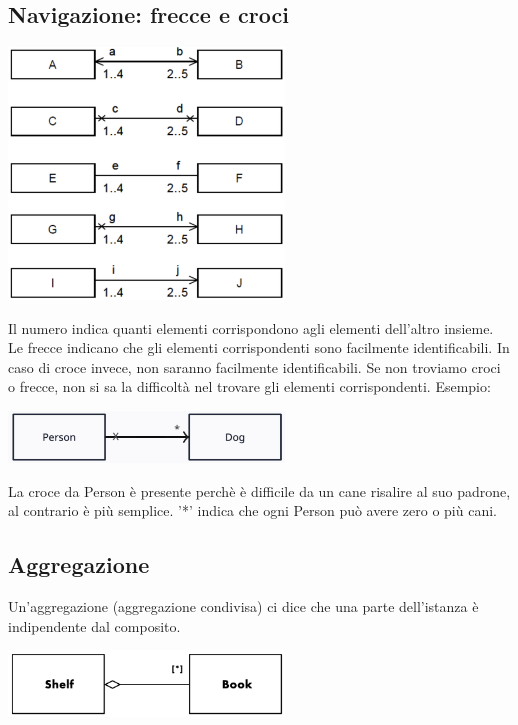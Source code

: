 \documentclass{article}
\begin{document}
\subsection*{Navigazione: frecce e croci}
\large
\begin{center}
    \includegraphics[width=0.55\textwidth]{foto 8.png}
\end{center}
Il numero indica quanti elementi corrispondono agli elementi dell'altro insieme. Le frecce indicano che gli elementi corrispondenti sono facilmente identificabili. In caso di croce invece, non saranno facilmente identificabili. Se non troviamo croci o frecce, non si sa la difficoltà nel trovare gli elementi corrispondenti. Esempio:
\begin{center}
    \includegraphics[width=0.55\textwidth]{foto 9.png}
\end{center}
La croce da Person è presente perchè è difficile da un cane risalire al suo padrone, al contrario è più semplice. '*' indica che ogni Person può avere zero o più cani.

\subsection*{Aggregazione}
\large

Un'aggregazione (aggregazione condivisa) ci dice che una parte dell'istanza è indipendente dal composito.
\begin{center}
    \includegraphics[width=0.55\textwidth]{foto 10.png}
\end{center}
\end{document}
